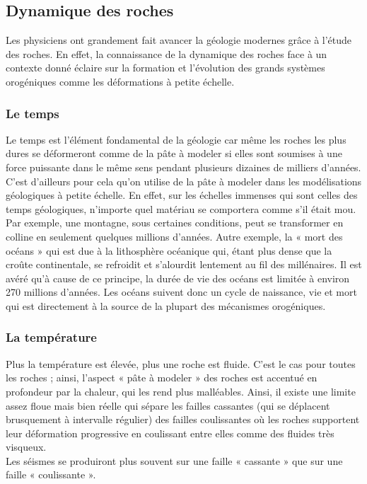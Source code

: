 \documentclass[a4paper,11pt]{article}
\begin{document}
\subsection{Dynamique des roches}
	
Les physiciens ont grandement fait avancer la géologie modernes grâce à l'étude des roches. En effet, la connaissance de la dynamique des roches face à un contexte donné éclaire sur la formation et l'évolution des grands systèmes orogéniques comme les déformations à petite échelle.\\

\subsubsection{Le temps}

Le temps est l'élément fondamental de la géologie car même les roches les plus dures se déformeront comme de la pâte à modeler si elles sont soumises à une force puissante dans le même sens pendant plusieurs dizaines de milliers d'années. C'est d'ailleurs pour cela qu'on utilise de la pâte à modeler dans les modélisations géologiques à petite échelle.
En effet, sur les échelles immenses qui sont celles des temps géologiques, n'importe quel matériau se comportera comme s'il était mou.\\
Par exemple, une montagne, sous certaines conditions, peut se transformer en colline en seulement quelques millions d'années.
Autre exemple, la « mort des océans » qui est due à la lithosphère océanique qui, étant plus dense que la croûte continentale, se refroidit et s'alourdit lentement au fil des millénaires.
Il est avéré qu'à cause de ce principe, la durée de vie des océans est limitée à environ 270 millions d'années.
Les océans suivent donc un cycle de naissance, vie et mort qui est directement à la source de la plupart des mécanismes orogéniques.

\subsubsection{La température}

Plus la température est élevée, plus une roche est fluide.
C'est le cas pour toutes les roches ; ainsi, l'aspect « pâte à modeler » des roches est accentué en profondeur par la chaleur, qui les rend plus malléables.
Ainsi, il existe une limite assez floue mais bien réelle qui sépare les failles cassantes (qui se déplacent brusquement à intervalle régulier) des failles coulissantes où les roches supportent leur déformation progressive en coulissant entre elles comme des fluides très visqueux.\\
Les séismes se produiront plus souvent sur une faille « cassante » que sur une faille « coulissante ».
\end{document}
